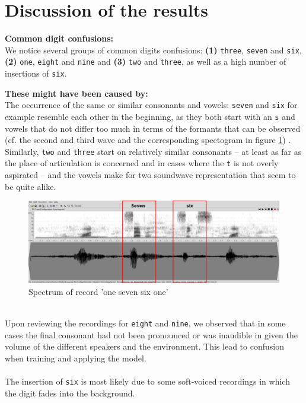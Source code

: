 \documentclass[onecolumn]{article}
\begin{document}
\clearpage
\section*{Discussion of the results}
\textbf{Common digit confusions:}\\
We notice several groups of common digits confusions: 
\textbf{(1)} \texttt{three}, \texttt{seven} and \texttt{six}, \textbf{(2)} \texttt{one}, \texttt{eight} and \texttt{nine} and \textbf{(3)} \texttt{two} and \texttt{three}, as well as a high number of insertions of \texttt{six}.

\vspace{0.3cm}

\noindent \textbf{These might have been caused by:}\\
The occurrence of the same or similar consonants and vowels: \texttt{seven} and \texttt{six} for example resemble each other in the beginning, as they both start with an \texttt{s} and vowels that do not differ too much in terms of the formants that can be observed (cf. the second and third wave and the corresponding spectogram in figure \ref{fig:record1}) . Similarly, \texttt{two} and \texttt{three} start on relatively similar consonants -- at least as far as the place of articulation is concerned and in cases where the \texttt{t} is not overly aspirated -- and the vowels make for two soundwave representation that seem to be quite alike.
\begin{figure}[htbp]
    \centering
    \includegraphics[width=15cm]{one_seven_six_one}
    \caption{Spectrum of record 'one seven six one'}
    \label{fig:record1}
\end{figure}
\\
Upon reviewing the recordings for \texttt{eight} and \texttt{nine}, we observed that in some cases the final consonant had not been pronounced or was inaudible in given the volume of the different speakers and the environment. This lead to confusion when training and applying the model.\\
\\
The insertion of \texttt{six} is most likely due to some soft-voiced recordings in which the digit fades into the background.\\
\end{document}
